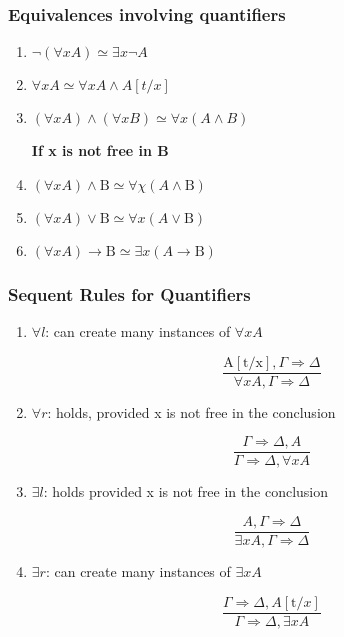 \documentclass{article}
\begin{document}
\subsubsection{Equivalences involving quantifiers}
\begin{enumerate}
    \item $\neg(\forall x A) \simeq \exists x \neg A$
    \item $\forall x A \simeq \forall x A \wedge A[t / x]$
    \item $(\forall x A) \wedge(\forall x B) \simeq \forall x(A \wedge B)$
    
    \bigskip
    \textbf{If x is not free in B}
    \item $(\forall x A) \wedge \mathrm{B} \simeq \forall \chi(A \wedge \mathrm{B})$
    \item $(\forall x A) \vee \mathrm{B} \simeq \forall x(A \vee \mathrm{B})$
    \item $(\forall x A) \rightarrow \mathrm{B} \simeq \exists x(A \rightarrow \mathrm{B})$
\end{enumerate}

\subsubsection{Sequent Rules for Quantifiers}
\begin{enumerate}
    \item \textbf{$\forall l$}: can create many instances of $\forall x A$
    
    $$\frac{\mathrm{A}[\mathrm{t} / \mathrm{x}], \Gamma \Rightarrow \Delta}{\forall x A, \Gamma \Rightarrow \Delta}$$
    
    \item \textbf{$\forall r$}: holds, provided x is not free in the conclusion
    
    $$\frac{\Gamma \Rightarrow \Delta, A}{\Gamma \Rightarrow \Delta, \forall x A}$$
    
    \item \textbf{$\exists l$}: holds provided x is not free in the conclusion
    
    $$\frac{A, \Gamma \Rightarrow \Delta}{\exists x A, \Gamma \Rightarrow \Delta}$$
    
    \item \textbf{$\exists r$}: can create many instances of $\exists x A$
    
    $$\frac{\Gamma \Rightarrow \Delta, A[\mathrm{t} / x]}{\Gamma \Rightarrow \Delta, \exists x A}$$
\end{enumerate}
\end{document}
